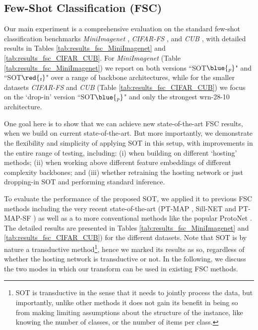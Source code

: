\subsection{Few-Shot Classification (FSC)}
Our main experiment is a comprehensive evaluation on the standard few-shot classification benchmarks \emph{MiniImagenet} \cite{vinyals2016matching}, \emph{CIFAR-FS} \cite{CIFAR}, and \emph{CUB} \cite{CUB}, with detailed results in Tables \ref{tab:results_fsc_MiniImagenet} and \ref{tab:results_fsc_CIFAR_CUB}. 
For \emph{MiniImagenet} (Table \ref{tab:results_fsc_MiniImagenet}) we report on both versions ``SOT$\blue{_\textit{p}}$" and ``SOT$\red{_\textit{t}}$" over a range of backbone architectures, while for the smaller datasets \emph{CIFAR-FS}  and \emph{CUB} (Table \ref{tab:results_fsc_CIFAR_CUB}) we focus on the `drop-in' version ``SOT$\blue{_\textit{p}}$" and only the strongest wrn-28-10 architecture.

One goal here is to show that we can achieve new state-of-the-art FSC results, when we build on current state-of-the-art. But more importantly, we demonstrate the flexibility and simplicity of applying SOT in this setup, with improvements in the entire range of testing, including: (i) when building on different `hosting' methods; (ii) when working above different feature embeddings of different complexity backbones; and (iii) whether retraining the hosting network or just dropping-in SOT and performing standard inference.

To evaluate the performance of the proposed SOT, we applied it to previous FSC methods including the very recent state-of-the-art (PT-MAP \cite{hu2020leveraging}, Sill-NET \cite{zhang2021sill} and PT-MAP-SF \cite{chen2021few}) as well as a to more conventional methods like the popular ProtoNet \cite{snell2017prototypical}. The detailed results are presented in Tables \ref{tab:results_fsc_MiniImagenet} and \ref{tab:results_fsc_CIFAR_CUB}) for the different datasets. Note that SOT is by nature a transductive method\footnote{SOT is transductive in the sense that it needs to jointly process the data, but importantly, unlike other methods it does not gain its benefit in being so from making limiting assumptions about the structure of the instance, like knowing the number of classes, or the number of items per class.}, hence we marked its results as so, regardless of whether the hosting network is transductive or not. In the following, we discuss the two modes in which our transform can be used in existing FSC methods.





